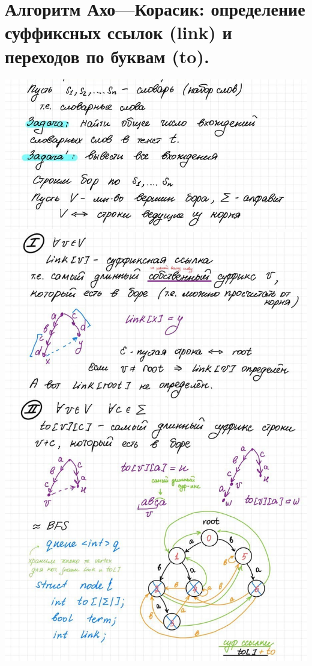 \section{Алгоритм Ахо—Корасик: определение суффиксных ссылок (link) и переходов по буквам (to).}

\includegraphics[width=1\linewidth]{images/Aho-Corasic1.jpg}
\newline \includegraphics[width=1\linewidth]{images/Aho-Corasic2.jpg}

